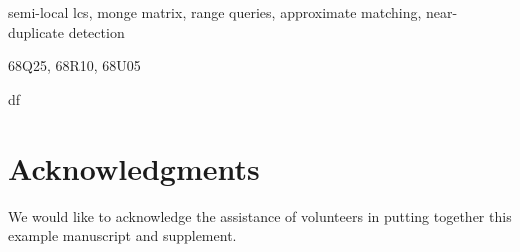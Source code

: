 \documentclass[review,onefignum,onetabnum]{siamart190516}
\begin{document}
\maketitle



\begin{keywords}
  semi-local lcs, monge matrix, range queries, approximate matching, near-duplicate detection
\end{keywords}

\begin{AMS}
  68Q25, 68R10, 68U05
\end{AMS}








df\cite{GoVa13}

\section*{Acknowledgments}
We would like to acknowledge the assistance of volunteers in putting
together this example manuscript and supplement.



\end{document}
